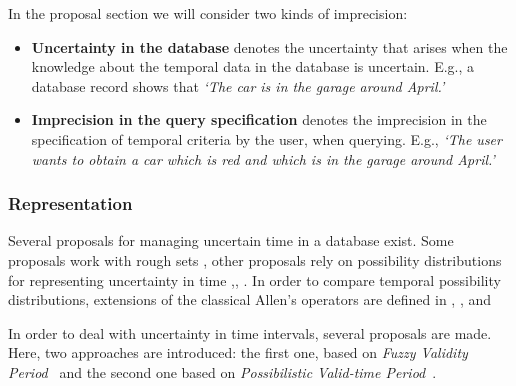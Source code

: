 In the proposal section we will consider two kinds of imprecision:
\begin{itemize}
\item \textbf{Uncertainty in the database} denotes the uncertainty that arises when the knowledge about the temporal data in the database is uncertain. E.g., a database record shows that \emph{`The car is in the garage around April.'}
 \item \textbf{Imprecision in the query specification} denotes the imprecision in the specification of temporal criteria by the user, when querying. E.g., \emph{`The user wants to obtain a car which is red and which is in the garage around April.'}
\end{itemize}

\subsubsection{Representation}
Several proposals for managing uncertain time in a database exist. Some proposals work with rough sets \cite{Qiang2009}, other proposals rely on possibility distributions for representing uncertainty in time \cite{Dyreson1998},\cite{Garrido2009}, \cite{Galindo2001}. In order to compare temporal possibility distributions, extensions of the classical Allen's operators \cite{Allen1983} are defined in \cite{Ohlbach2004}, \cite{Nagypal2003},\cite{Dubois2003a} and \cite{Schockaert2008}



In order to deal with uncertainty in time intervals, several proposals are made. Here, two approaches are introduced: the first one, based on \emph{Fuzzy Validity Period}~\cite{Garrido2009} and the second one based on \emph{Possibilistic Valid-time Period}~\cite{JoseEnriquePons2012}.

